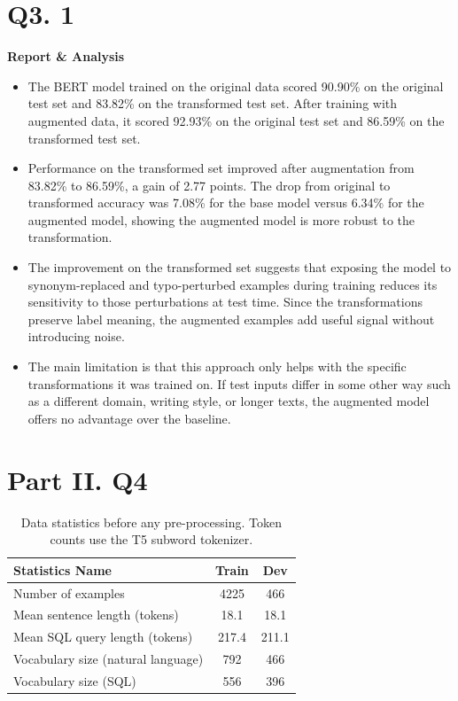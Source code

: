 \documentclass{article}
\begin{document}
\section*{Q3. 1}
\textbf{Report \& Analysis}
    \begin{itemize}
        \item The BERT model trained on the original data scored 90.90\% on the original test set and 83.82\% on the transformed test set. After training with augmented data, it scored 92.93\% on the original test set and 86.59\% on the transformed test set.

        \item Performance on the transformed set improved after augmentation from 83.82\% to 86.59\%, a gain of 2.77 points. The drop from original to transformed accuracy was 7.08\% for the base model versus 6.34\% for the augmented model, showing the augmented model is more robust to the transformation.

        \item The improvement on the transformed set suggests that exposing the model to synonym-replaced and typo-perturbed examples during training reduces its sensitivity to those perturbations at test time. Since the transformations preserve label meaning, the augmented examples add useful signal without introducing noise.

        \item The main limitation is that this approach only helps with the specific transformations it was trained on. If test inputs differ in some other way such as a different domain, writing style, or longer texts, the augmented model offers no advantage over the baseline.
    \end{itemize}

\section*{Part II. Q4}

\begin{table}[h!]
\centering
\begin{tabular}{lcc}
\toprule
Statistics Name & Train & Dev \\
\midrule
Number of examples & 4225 & 466 \\
Mean sentence length (tokens) & 18.1 & 18.1 \\
Mean SQL query length (tokens) & 217.4 & 211.1 \\
Vocabulary size (natural language) & 792 & 466 \\
Vocabulary size (SQL) & 556 & 396 \\
\bottomrule
\end{tabular}
\caption{Data statistics before any pre-processing. Token counts use the T5 subword tokenizer.}
\label{tab:data_stats_before}
\end{table}
\end{document}
